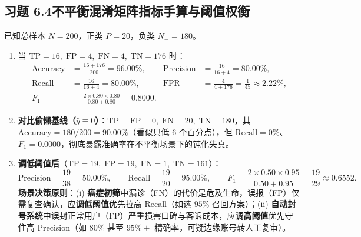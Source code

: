 \subsection*{习题 6.4\quad 不平衡混淆矩阵指标手算与阈值权衡}
已知总样本 $N = 200$，正类 $P = 20$，负类 $N_- = 180$。
\begin{enumerate}[label=(\alph*), leftmargin=1.8em]
  \item 当 $\mathrm{TP}=16,\; \mathrm{FP}=4,\; \mathrm{FN}=4,\; \mathrm{TN}=176$ 时：
  \begin{align*}
    \mathrm{Accuracy} &= \frac{16 + 176}{200} = \mathbf{96.00\%}, &
    \mathrm{Precision} &= \frac{16}{16 + 4} = \mathbf{80.00\%}, \\
    \mathrm{Recall} &= \frac{16}{16 + 4} = \mathbf{80.00\%}, &
    \mathrm{FPR} &= \frac{4}{4 + 176} = \frac{1}{45} \approx \mathbf{2.22\%}, \\
    F_1 &= \frac{2\times 0.80\times 0.80}{0.80 + 0.80} = \mathbf{0.8000}.
  \end{align*}
  \item \textbf{对比偷懒基线（$\hat{y}\equiv 0$）}：$\mathrm{TP}=\mathrm{FP}=0,\; \mathrm{FN}=20,\; \mathrm{TN}=180$，其 $\mathrm{Accuracy} = 180/200 = \mathbf{90.00\%}$（看似只低 6 个百分点），但 $\mathrm{Recall} = 0\%$、$F_1 = \mathbf{0.0000}$，彻底暴露准确率在不平衡场景下的钝化失真。
  \item \textbf{调低阈值后}（$\mathrm{TP}=19,\; \mathrm{FP}=19,\; \mathrm{FN}=1,\; \mathrm{TN}=161$）：
  \[
    \mathrm{Precision} = \frac{19}{38} = \mathbf{50.00\%}, \qquad
    \mathrm{Recall} = \frac{19}{20} = \mathbf{95.00\%}, \qquad
    F_1 = \frac{2\times 0.50\times 0.95}{0.50 + 0.95} = \frac{19}{29} \approx \mathbf{0.6552}.
  \]
  \textbf{场景决策原则}：(i) \textbf{癌症初筛}中漏诊（FN）的代价是危及生命，误报（FP）仅需复查确认，应\textbf{调低阈值}优先拉高 Recall（如选 $95\%$ 召回方案）；(ii) \textbf{自动封号系统}中误封正常用户（FP）严重损害口碑与客诉成本，应\textbf{调高阈值}优先守住高 Precision（如 $80\%$ 甚至 $95\%+$ 精确率，可疑边缘账号转人工复审）。
\end{enumerate}

